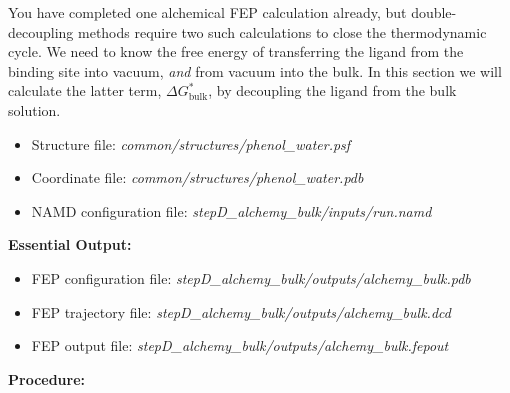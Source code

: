 \documentclass[9pt,tutorial]{Styling/livecoms}
\newcommand{\filepath}[1]{\textit{#1}}
\begin{document}
\label{step:bulkDecoupling}
    \begin{tcolorbox}[colback=blue!5!white,colframe=blue!75!black]
    You have completed one alchemical FEP calculation already, but double-decoupling methods require two such calculations to close the thermodynamic cycle. We need to know the free energy of transferring the ligand from the binding site into vacuum, {\it and} from vacuum into the bulk.  In this section we will calculate the latter term, $\Delta G_\mathrm{bulk}^*$, by decoupling the ligand from the bulk solution. 
    \end{tcolorbox}
    \begin{itemize}
        \item Structure file: \filepath{common/structures/phenol\_water.psf} 
        \item Coordinate file: \filepath{common/structures/phenol\_water.pdb}
        \item NAMD configuration file: \filepath{stepD\_alchemy\_bulk/inputs/run.namd}
    \end{itemize}
    \textbf{Essential Output:}
    \begin{itemize}
        \item FEP configuration file: \filepath{stepD\_alchemy\_bulk/outputs/alchemy\_bulk.pdb}
        \item FEP trajectory file: \filepath{stepD\_alchemy\_bulk/outputs/alchemy\_bulk.dcd}
        \item FEP output file: \filepath{stepD\_alchemy\_bulk/outputs/alchemy\_bulk.fepout}
    \end{itemize}
    \textbf{Procedure:}
\end{document}
